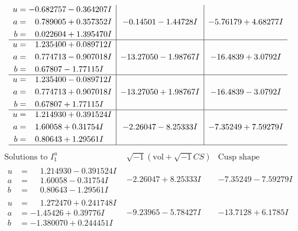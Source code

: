 \documentclass[1p]{elsarticle_modified}
\theoremstyle{definition}
\newcommand{\I}{\sqrt{-1}}
\begin{document}
$$\begin{array}{c|c|c}
\begin{aligned}
u &= -0.682757 - 0.364207 I \\
a &= \phantom{-}0.789005 + 0.357352 I \\
b &= \phantom{-}0.022604 + 1.395470 I\end{aligned}
 & -0.14501 - 1.44728 I & -5.76179 + 4.68277 I \\ \hline\begin{aligned}
u &= \phantom{-}1.235400 + 0.089712 I \\
a &= \phantom{-}0.774713 - 0.907018 I \\
b &= \phantom{-}0.67807 - 1.77115 I\end{aligned}
 & -13.27050 - 1.98767 I & -16.4839 + 3.0792 I \\ \hline\begin{aligned}
u &= \phantom{-}1.235400 - 0.089712 I \\
a &= \phantom{-}0.774713 + 0.907018 I \\
b &= \phantom{-}0.67807 + 1.77115 I\end{aligned}
 & -13.27050 + 1.98767 I & -16.4839 - 3.0792 I \\ \hline\begin{aligned}
u &= \phantom{-}1.214930 + 0.391524 I \\
a &= \phantom{-}1.60058 + 0.31754 I \\
b &= \phantom{-}0.80643 + 1.29561 I\end{aligned}
 & -2.26047 - 8.25333 I & -7.35249 + 7.59279 I\\
 \hline 
 \end{array}$$\newpage$$\begin{array}{c|c|c}  
\text{Solutions to }I^u_{1}& \I (\text{vol} + \sqrt{-1}CS) & \text{Cusp shape}\\
 \hline 
\begin{aligned}
u &= \phantom{-}1.214930 - 0.391524 I \\
a &= \phantom{-}1.60058 - 0.31754 I \\
b &= \phantom{-}0.80643 - 1.29561 I\end{aligned}
 & -2.26047 + 8.25333 I & -7.35249 - 7.59279 I \\ \hline\begin{aligned}
u &= \phantom{-}1.272470 + 0.241748 I \\
a &= -1.45426 + 0.39776 I \\
b &= -1.380070 + 0.244451 I\end{aligned}
 & -9.23965 - 5.78427 I & -13.7128 + 6.1785 I \\ \hline\begin{aligned}

\end{aligned}
\end{array}$$
\end{document}
